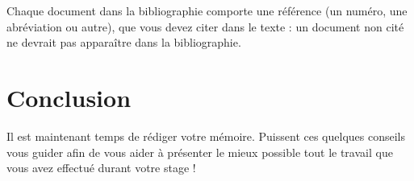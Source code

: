 \documentclass [twoside,openright,a4paper,11pt,french] {report}
\begin{document}
Chaque document dans la bibliographie comporte une référence (un
numéro, une abréviation ou autre), que vous devez citer dans le texte :
un document non cité ne devrait pas apparaître dans la bibliographie.


\chapter {Conclusion}
    \label {chap:conc}

Il est maintenant temps de rédiger votre mémoire. Puissent ces quelques
conseils vous guider afin de vous aider à présenter le mieux possible
tout le travail que vous avez effectué durant votre stage !



\cleardoublepage


\end{document}
